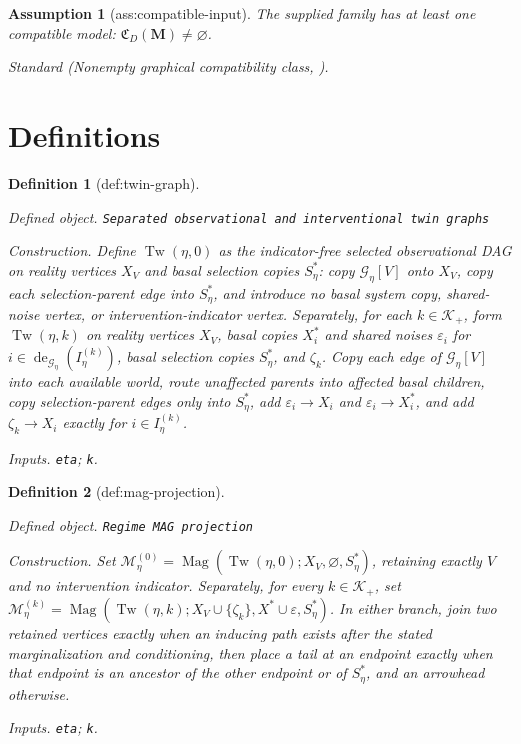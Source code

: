 \documentclass{article}
\newtheorem{assumption}{Assumption}
\newtheorem{definition}{Definition}
\begin{document}
\begin{assumption}[ass:compatible-input]\label{ass:compatible-input}
The supplied family has at least one compatible model: \(\mathfrak C_D(\mathbf M)\ne\varnothing\).
\par\smallskip\noindent\emph{Standard} (Nonempty graphical compatibility class, \cite{DaiEtAl2025SelectionIntervention}).
\end{assumption}

\section{Definitions}

\begin{definition}[def:twin-graph]\label{def:twin-graph}
\par\smallskip\noindent\emph{Defined object.} \texttt{Separated observational and interventional twin graphs}
\par\smallskip\noindent\emph{Construction.} Define \(\operatorname{Tw}(\eta,0)\) as the indicator-free selected observational DAG on reality vertices \(X_V\) and basal selection copies \(S_\eta^*\): copy \(\mathcal G_\eta[V]\) onto \(X_V\), copy each selection-parent edge into \(S_\eta^*\), and introduce no basal system copy, shared-noise vertex, or intervention-indicator vertex. Separately, for each \(k\in\mathcal K_+\), form \(\operatorname{Tw}(\eta,k)\) on reality vertices \(X_V\), basal copies \(X_i^*\) and shared noises \(\varepsilon_i\) for \(i\in\operatorname{de}_{\mathcal G_\eta}(I_\eta^{(k)})\), basal selection copies \(S_\eta^*\), and \(\zeta_k\). Copy each edge of \(\mathcal G_\eta[V]\) into each available world, route unaffected parents into affected basal children, copy selection-parent edges only into \(S_\eta^*\), add \(\varepsilon_i\to X_i\) and \(\varepsilon_i\to X_i^*\), and add \(\zeta_k\to X_i\) exactly for \(i\in I_\eta^{(k)}\).
\par\smallskip\noindent\emph{Inputs.} \texttt{eta}; \texttt{k}.
\end{definition}

\begin{definition}[def:mag-projection]\label{def:mag-projection}
\par\smallskip\noindent\emph{Defined object.} \texttt{Regime MAG projection}
\par\smallskip\noindent\emph{Construction.} Set \(\mathcal M_\eta^{(0)}=\operatorname{Mag}(\operatorname{Tw}(\eta,0);X_V,\varnothing,S_\eta^*)\), retaining exactly \(V\) and no intervention indicator. Separately, for every \(k\in\mathcal K_+\), set \(\mathcal M_\eta^{(k)}=\operatorname{Mag}(\operatorname{Tw}(\eta,k);X_V\cup\{\zeta_k\},X^*\cup\varepsilon,S_\eta^*)\). In either branch, join two retained vertices exactly when an inducing path exists after the stated marginalization and conditioning, then place a tail at an endpoint exactly when that endpoint is an ancestor of the other endpoint or of \(S_\eta^*\), and an arrowhead otherwise.
\par\smallskip\noindent\emph{Inputs.} \texttt{eta}; \texttt{k}.
\end{definition}
\end{document}
